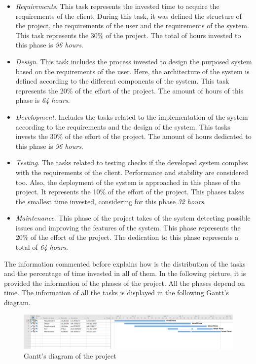 \begin{itemize}

\item \textit{Requirements}. This task represents the invested time to acquire the requirements of the client. During this task, it was defined the structure of the project, the requirements of the user and the requirements of the system. This task represents the 30\% of the project. The total of hours invested to this phase is \textit{96 hours}.
\item \textit{Design}. This task includes the process invested to design the purposed system based on the requirements of the user. Here, the architecture of the system is defined according to the different components of the system. This task represents the 20\% of the effort of the project. The amount of hours of this phase is \textit{64 hours}.
\item \textit{Development}. Includes the tasks related to the implementation of the system according to the requirements and the design of the system. This tasks invests the 30\% of the effort of the project. The amount of hours dedicated to this phase is \textit{96 hours}.
\item \textit{Testing}. The tasks related to testing checks if the developed system complies with the requirements of the client. Performance and stability are considered too. Also, the deployment of the system is approached in this phase of the project. It represents the 10\% of the effort of the project. This phases takes the smallest time invested, considering for this phase \textit{32 hours}.
\item \textit{Maintenance}. This phase of the project takes of the system detecting possible issues and improving the features of the system. This phase represents the 20\% of the effort of the project. The dedication to this phase represents a total of \textit{64 hours}.

\end{itemize}

The information commented before explains how is the distribution of the tasks and the percentage of time invested in all of them. In the following picture, it is provided the information of the phases of the project. All the phases depend on time. The information of all the tasks is displayed in the following Gantt's diagram.\\

\begin{figure}[H]
\begin{centering}
\includegraphics[scale=0.35]{IMGS/gant_chart.PNG}
\caption{Gantt's diagram of the project \label{Gantt's diagram}}
\end{centering}
\end{figure}

